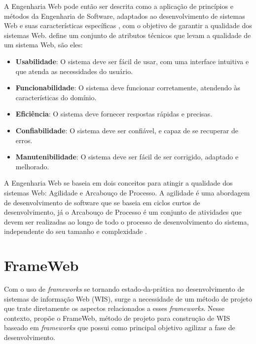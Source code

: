 A Engenharia Web pode então ser descrita como a aplicação de princípios e métodos da Engenharia
de Software, adaptados ao desenvolvimento de sistemas Web e suas características específicas 
\cite{beder:2017,murugesan:2001}, com o objetivo de garantir a qualidade dos sistemas Web. 
\cite{olsina:2001} define um conjunto de atributos técnicos que levam a qualidade de um sistema Web,
são eles:

\begin{itemize}
    \item \textbf{Usabilidade}: O sistema deve ser fácil de usar, com uma interface intuitiva e 
        que atenda as necessidades do usuário.
    \item \textbf{Funcionabilidade}: O sistema deve funcionar corretamente, atendendo às características
        do domínio.
    \item \textbf{Eficiência}: O sistema deve fornecer respostas rápidas e precisas.
    \item \textbf{Confiabilidade}: O sistema deve ser confiável, e capaz de se recuperar de erros.
    \item \textbf{Manutenibilidade}: O sistema deve ser fácil de ser corrigido, adaptado e melhorado.
\end{itemize}

A Engenharia Web se baseia em dois conceitos para atingir a qualidade dos sistemas Web: Agilidade e Arcabouço de Processo.
A agilidade é uma abordagem de desenvolvimento de software que se baseia em ciclos curtos de desenvolvimento,
já o Arcabouço de Processo é um conjunto de atividades que devem ser realizadas ao longo de todo o processo
de desenvolvimento do sistema, independente do seu tamanho e complexidade \cite{beder:2017}.



\section{FrameWeb}
\label{sec-fundteo-frameweb}

Com o uso de \textit{frameworks} se tornando estado-da-prática no  desenvolvimento 
de sistemas de informação Web (WIS), surge a necessidade de um método de projeto
que trate diretamente os aspectos relacionados a esses \textit{frameworks}.
Nesse contexto,  propõe o FrameWeb, método de projeto 
para construção de WIS baseado em \textit{frameworks} que possui como principal 
objetivo agilizar a fase de desenvolvimento.

